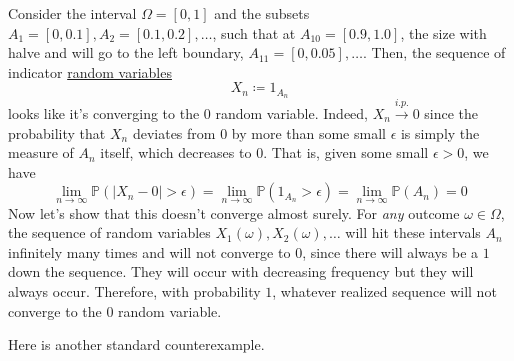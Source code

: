   \begin{example}
    \label{ex:c-in-probability-centernotimplies-c-almost}
    Consider the interval $\Omega = [0, 1]$ and the subsets $A_1 = [0, 0.1], A_2 = [0.1, 0.2], \ldots$, such that at $A_{10} = [0.9, 1.0]$, the size with halve and will go to the left boundary, $A_{11} = [0, 0.05], \ldots$. Then, the sequence of indicator \hyperref[def:random-variable]{random variables} 
    \begin{equation}
      X_n \coloneqq 1_{A_n}
    \end{equation}
    looks like it's converging to the $0$ random variable. Indeed, $X_n \xrightarrow{i.p.} 0$ since the probability that $X_n$ deviates from $0$ by more than some small $\epsilon$ is simply the measure of $A_n$ itself, which decreases to $0$. That is, given some small $\epsilon > 0$, we have 
    \begin{equation}
      \lim_{n \rightarrow \infty} \mathbb{P} (|X_n - 0| > \epsilon) = \lim_{n \rightarrow \infty} \mathbb{P}(1_{A_n} > \epsilon ) = \lim_{n \rightarrow \infty} \mathbb{P}(A_n) = 0
    \end{equation}
    Now let's show that this doesn't converge almost surely. For \textit{any} outcome $\omega \in \Omega$, the sequence of random variables $X_1(\omega), X_2(\omega), \ldots$ will hit these intervals $A_n$ infinitely many times and will not converge to $0$, since there will always be a $1$ down the sequence. They will occur with decreasing frequency but they will always occur. Therefore, with probability $1$, whatever realized sequence will not converge to the $0$ random variable. 
  \end{example}

  Here is another standard counterexample. 

